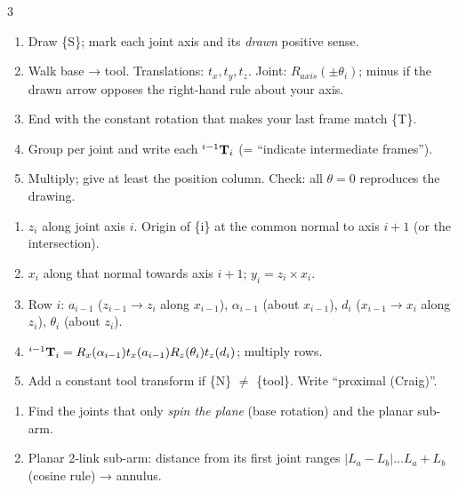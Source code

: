 \begin{multicols}{3}
\begin{recipe}\label{r:fk}
\begin{enumerate}
\item Draw \{S\}; mark each joint axis and its \emph{drawn} positive sense.
\item Walk base → tool. Translations: $t_x,t_y,t_z$. Joint: $R_{axis}(\pm\theta_i)$; minus if the drawn arrow opposes the right-hand rule about your axis.
\item End with the constant rotation that makes your last frame match \{T\}.
\item Group per joint and write each $^{i-1}\mathbf T_i$ (= ``indicate intermediate frames'').
\item Multiply; give at least the position column. Check: all $\theta=0$ reproduces the drawing.
\end{enumerate}
\end{recipe}
\begin{recipe}\label{r:dh}
\begin{enumerate}
\item $z_i$ along joint axis $i$. Origin of \{i\} at the common normal to axis $i{+}1$ (or the intersection).
\item $x_i$ along that normal towards axis $i{+}1$; $y_i=z_i\times x_i$.
\item Row $i$: $a_{i-1}$ ($z_{i-1}\to z_i$ along $x_{i-1}$), $\alpha_{i-1}$ (about $x_{i-1}$), $d_i$ ($x_{i-1}\to x_i$ along $z_i$), $\theta_i$ (about $z_i$).
\item ${}^{i-1}\mathbf T_i=R_x(\alpha_{i-1})t_x(a_{i-1})R_z(\theta_i)t_z(d_i)$; multiply rows.
\item Add a constant tool transform if \{N\} $\ne$ \{tool\}. Write ``proximal (Craig)''.
\end{enumerate}
\end{recipe}
\begin{recipe}\label{r:ws}
\begin{enumerate}
\item Find the joints that only \emph{spin the plane} (base rotation) and the planar sub-arm.
\item Planar 2-link sub-arm: distance from its first joint ranges $|L_a-L_b|\dots L_a+L_b$ (cosine rule) → annulus.

\end{enumerate}
\end{recipe}
\end{multicols}
